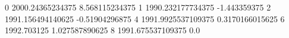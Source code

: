 0 2000.24365234375 8.568115234375
1 1990.232177734375 -1.443359375
2 1991.156494140625 -0.51904296875
4 1991.9925537109375 0.3170166015625
6 1992.703125 1.027587890625
8 1991.675537109375 0.0

